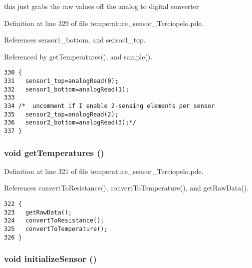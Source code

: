 this just grabs the raw values off the analog to digital converter 



Definition at line 329 of file temperature\_\-sensor\_\-Terciopelo.pde.

References sensor1\_\-bottom, and sensor1\_\-top.

Referenced by getTemperatures(), and sample().

\begin{Code}\begin{verbatim}330 {
331   sensor1_top=analogRead(0);
332   sensor1_bottom=analogRead(1);
333   
334 /*  uncomment if I enable 2-sensing elements per sensor
335   sensor2_top=analogRead(2);
336   sensor2_bottom=analogRead(3);*/
337 }
\end{verbatim}
\end{Code}


\hypertarget{temperature__sensor___terciopelo_8pde_ea28af0c7128421a38589128bb39ef1c}{
\subsubsection[{getTemperatures}]{\setlength{\rightskip}{0pt plus 5cm}void getTemperatures ()}}
\label{temperature__sensor___terciopelo_8pde_ea28af0c7128421a38589128bb39ef1c}




Definition at line 321 of file temperature\_\-sensor\_\-Terciopelo.pde.

References convertToResistance(), convertToTemperature(), and getRawData().

\begin{Code}\begin{verbatim}322 {
323   getRawData();
324   convertToResistance();
325   convertToTemperature();
326 }
\end{verbatim}
\end{Code}


\hypertarget{temperature__sensor___terciopelo_8pde_f6c9587ccbcf223f8c79f508c2fef366}{
\subsubsection[{initializeSensor}]{\setlength{\rightskip}{0pt plus 5cm}void initializeSensor ()}}
\label{temperature__sensor___terciopelo_8pde_f6c9587ccbcf223f8c79f508c2fef366}


